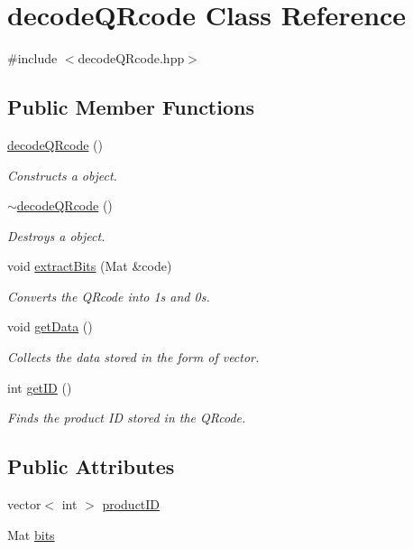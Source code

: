 \hypertarget{classdecodeQRcode}{}\section{decode\+Q\+Rcode Class Reference}
\label{classdecodeQRcode}


{\ttfamily \#include $<$decode\+Q\+Rcode.\+hpp$>$}

\subsection*{Public Member Functions}
\begin{DoxyCompactItemize}
\item 
\hyperlink{classdecodeQRcode_a70b4f300706eba2cf101fa8df5d88f5c}{decode\+Q\+Rcode} ()
\begin{DoxyCompactList}\small\item\em Constructs a object. \end{DoxyCompactList}\item 
\hyperlink{classdecodeQRcode_a65a50ce566c4ea9f66791b628c4cc17a}{$\sim$decode\+Q\+Rcode} ()
\begin{DoxyCompactList}\small\item\em Destroys a object. \end{DoxyCompactList}\item 
void \hyperlink{classdecodeQRcode_a5f805f807f0dd0f60e0a1727724dbb47}{extract\+Bits} (Mat \&code)
\begin{DoxyCompactList}\small\item\em Converts the Q\+Rcode into 1\textquotesingle{}s and 0\textquotesingle{}s. \end{DoxyCompactList}\item 
void \hyperlink{classdecodeQRcode_ad72967ae804cfbee23ee05f2a82b1fc3}{get\+Data} ()
\begin{DoxyCompactList}\small\item\em Collects the data stored in the form of vector. \end{DoxyCompactList}\item 
int \hyperlink{classdecodeQRcode_a9f5367c400fdd17f4ae09af140b7e604}{get\+ID} ()
\begin{DoxyCompactList}\small\item\em Finds the product ID stored in the Q\+Rcode. \end{DoxyCompactList}\end{DoxyCompactItemize}
\subsection*{Public Attributes}
\begin{DoxyCompactItemize}
\item 
vector$<$ int $>$ \hyperlink{classdecodeQRcode_aec2882b61f6f3694856894a36248a66d}{product\+ID}
\item 
Mat \hyperlink{classdecodeQRcode_a5041ce83542f15b8ccd67203e9426fe4}{bits}
\end{DoxyCompactItemize}



